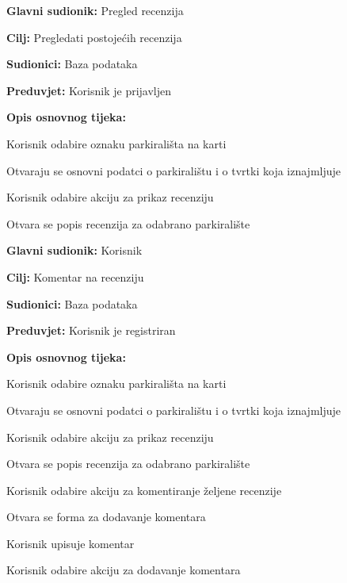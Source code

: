 \noindent {}
\begin{packed_item}
	
	\item \textbf{Glavni sudionik:} Pregled recenzija
	\item  \textbf{Cilj:} Pregledati postojećih recenzija
	\item  \textbf{Sudionici:} Baza podataka
	\item  \textbf{Preduvjet:} Korisnik je prijavljen
	\item  \textbf{Opis osnovnog tijeka:}
	
	\item[] \begin{packed_enum}
		
		\item Korisnik odabire oznaku parkirališta na karti
		\item Otvaraju se osnovni podatci o parkiralištu i o tvrtki koja iznajmljuje
		\item Korisnik odabire akciju za prikaz recenziju
		\item Otvara se popis recenzija za odabrano parkiralište
	
	\end{packed_enum}
\end{packed_item}


\noindent {}
\begin{packed_item}
	
	\item \textbf{Glavni sudionik:} Korisnik
	\item  \textbf{Cilj:} Komentar na recenziju
	\item  \textbf{Sudionici:} Baza podataka
	\item  \textbf{Preduvjet:} Korisnik je registriran
	\item  \textbf{Opis osnovnog tijeka:}
	
	\item[] \begin{packed_enum}
		
		\item Korisnik odabire oznaku parkirališta na karti
		\item Otvaraju se osnovni podatci o parkiralištu i o tvrtki koja iznajmljuje
		\item Korisnik odabire akciju za prikaz recenziju
		\item Otvara se popis recenzija za odabrano parkiralište
		\item Korisnik odabire akciju za komentiranje željene recenzije
		\item Otvara se forma za dodavanje komentara
		\item Korisnik upisuje komentar
		\item Korisnik odabire akciju za dodavanje komentara
		
	\end{packed_enum}
\end{packed_item}

